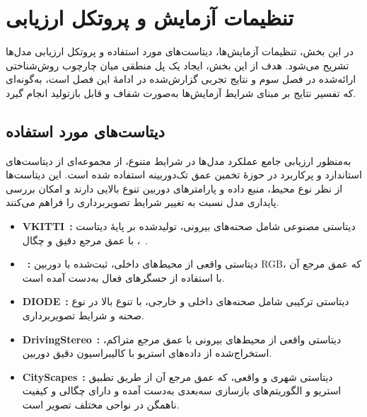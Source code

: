 \section{تنظیمات آزمایش و پروتکل ارزیابی}
\label{sec:experimental_setup}

در این بخش، تنظیمات آزمایش‌ها، دیتاست‌های مورد استفاده
و پروتکل ارزیابی مدل‌ها تشریح می‌شود.
هدف از این بخش، ایجاد یک پل منطقی میان چارچوب روش‌شناختی
ارائه‌شده در فصل سوم و نتایج تجربی گزارش‌شده در ادامهٔ این فصل است،
به‌گونه‌ای که تفسیر نتایج بر مبنای شرایط آزمایش‌ها
به‌صورت شفاف و قابل بازتولید انجام گیرد.

\subsection{دیتاست‌های مورد استفاده}
به‌منظور ارزیابی جامع عملکرد مدل‌ها در شرایط متنوع،
از مجموعه‌ای از دیتاست‌های استاندارد و پرکاربرد
در حوزهٔ تخمین عمق تک‌دوربینه استفاده شده است.
این دیتاست‌ها از نظر نوع محیط، منبع داده و پارامترهای دوربین
تنوع بالایی دارند و امکان بررسی پایداری مدل
نسبت به تغییر شرایط تصویربرداری را فراهم می‌کنند.

\begin{itemize}
    \item \textbf{VKITTI}~\cite{Gaidon2016VKITTI}\textbf{:}
    دیتاستی مصنوعی
    شامل صحنه‌های بیرونی، تولیدشده بر پایهٔ دیتاست ~\cite{Geiger2012KITTI}،
    با عمق مرجع دقیق و چگال.

    \item \textbf{}~\cite{Silberman2012NYUv2}\textbf{:}
    دیتاستی واقعی از محیط‌های داخلی،
    ثبت‌شده با دوربین RGB،
    که عمق مرجع آن با استفاده از حسگرهای فعال به‌دست آمده است.

    \item \textbf{DIODE}~\cite{Vasiljevic2019DIODE}\textbf{:}
    دیتاستی ترکیبی شامل صحنه‌های داخلی و خارجی،
    با تنوع بالا در نوع صحنه و شرایط تصویربرداری.

    \item \textbf{DrivingStereo}~\cite{Yang2019DrivingStereo}\textbf{:}
    دیتاستی واقعی از محیط‌های بیرونی
    با عمق مرجع متراکم،
    استخراج‌شده از داده‌های استریو با کالیبراسیون دقیق دوربین.

    \item \textbf{CityScapes}~\cite{Cordts2016Cityscapes}\textbf{:}
    دیتاستی شهری و واقعی،
    که عمق مرجع آن از طریق تطبیق استریو
    و الگوریتم‌های بازسازی سه‌بعدی به‌دست آمده
    و دارای چگالی و کیفیت ناهمگن در نواحی مختلف تصویر است.
\end{itemize}

